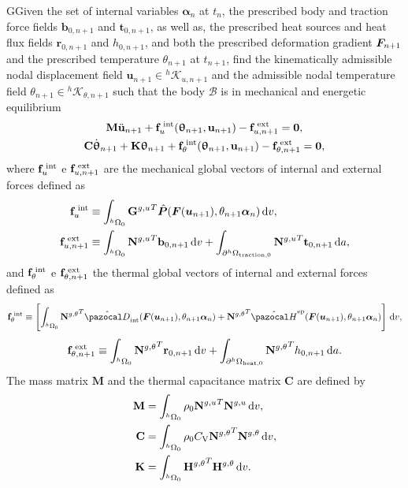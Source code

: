 \begin{problem}
GGiven the set of internal variables $\bm \alpha_n$ at $t_n$, the prescribed body and traction force fields $\bm b_{0,n+1}$ and $\bm t_{0,n+1}$, as well as, the prescribed heat sources and heat flux fields \(\bm r_{0,n+1}\) and \(h_{0,n+1}\), and both the prescribed deformation gradient $\bm{F}_{n+1}$ and the prescribed temperature \(\theta_{n+1}\) at $t_{n+1}$, find the kinematically admissible nodal displacement field $\bm u_{n+1}\in {^h\mathscr{K}_{u,n+1}}$ and the admissible nodal temperature field \(\theta_{n+1}\in{^h\mathscr{K}_{\theta,n+1}}\) such that the body $\mathscr{B}$ is in mechanical and energetic equilibrium
\begin{gather}
    \mathbf M \ddot{\mathbf u}_{n+1} +\mathbf f_u^\text{\;int}(\bm \uptheta_{n+1}, \mathbf u_{n+1})-\mathbf f^\text{\;ext}_{u,n+1}=\mathbf 0, \\
    \mathbf C \dot{\bm \uptheta}_{n+1} + \mathbf K {\bm \uptheta}_{n+1} + \mathbf f_\theta^\text{\;int}(\bm \uptheta_{n+1}, \mathbf u_{n+1})-\mathbf f^\text{\;ext}_{\theta,n+1}=\mathbf 0,
\end{gather}
where $\mathbf f_u^\text{\;int}$ e $\mathbf f^\text{\;ext}_{u,n+1}$ are the mechanical global vectors of internal and external forces defined as
\begin{align}
    \mathbf f_u^\text{\;int} &\equiv \int_{^h\Omega_0}{\mathbf G^{g,u}}^T \hat{\bm{P}}(\bm{F}(\bm u_{n+1}), \theta_{n+1} \bm \alpha_n)\,\mathrm{d} v,\\
    \mathbf f^\text{\;ext}_{u,n+1} &\equiv \int_{^h\Omega_0}{\mathbf N^{g,u}}^T \mathbf b_{0,n+1}\,\mathrm{d} v + \int_{\partial^h\Omega_\text{traction,0}}{\mathbf N^{g,u}}^T \mathbf t_{0,n+1}\,\mathrm{d} a,
\end{align}
and $\mathbf f_\theta^\text{\;int}$ e $\mathbf f^\text{\;ext}_{\theta,n+1}$ the thermal global vectors of internal and external forces defined as
\begin{multline}
    \mathbf f_\theta^\text{\;int} \equiv \left[\int_{^h\Omega_0}{\mathbf N^{g,\theta}}^T \hat{\pazocal D}_\text{int}(\mat F(\bm u_{n+1}), \theta_{n+1} \bm \alpha_n) +{\mathbf N^{g,\theta}}^T\hat{\pazocal H}^\text{ep}(\mat F(\bm u_{n+1}), \theta_{n+1} \bm \alpha_n)\right] \ud v,
\end{multline}
\begin{equation}
    \mathbf f^\text{\;ext}_{\theta,n+1} \equiv \int_{^h\Omega_0}{\mathbf N^{g,\theta}}^T \mathbf r_{0,n+1}\,\mathrm{d} v + \int_{\partial^h\Omega_\text{heat,0}}{\mathbf N^{g,\theta}}^T h_{0,n+1}\,\mathrm{d} a.
\end{equation}
The mass matrix $\mathbf M$ and the thermal capacitance matrix \(\mathbf C\) are defined by
\begin{align}
  \mathbf M &= \int_{{}^h\Omega_0} \rho_0 {\mathbf{N}^{g,u}}^T\mathbf{N}^{g,u} \,\mathrm{d} v,\\
  \mathbf C &= \int_{{}^h\Omega_0} \rho_0C_\mathrm{V} {\mathbf{N}^{g,\theta}}^T\mathbf{N}^{g,\theta} \,\mathrm{d} v,\\
  \mathbf K &= \int_{{}^h\Omega_0} {\mathbf H^{g,\theta}}^T\mathbf H^{g,\theta} \,\mathrm{d} v.
\end{align}
\end{problem}

